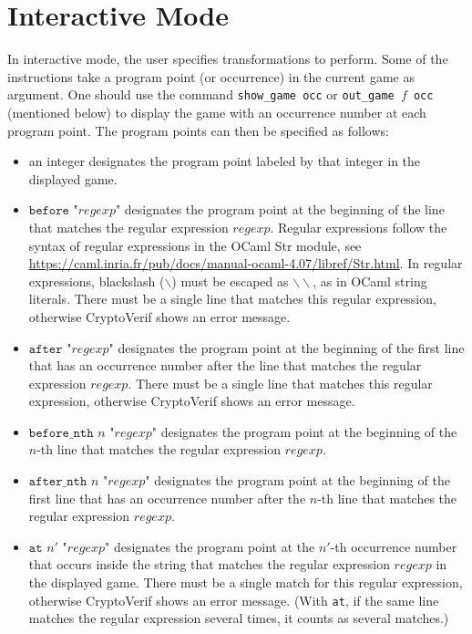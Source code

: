 \documentclass{article}
\begin{document}
\fussy

\section{Interactive Mode}\label{sec:interact}

In interactive mode, the user specifies transformations to perform.
Some of the instructions take a program point (or occurrence)
in the current game as argument.
One should use the command \texttt{show\string_game occ}
or \texttt{out\string_game $f$ occ} (mentioned below) to
display the game with an occurrence number at each program point.
The program points can then be specified as follows:
\begin{itemize}
\item an integer designates the program point labeled by that integer in
  the displayed game.
\item $\texttt{before "}\mathit{regexp}\texttt{"}$ designates the program
  point at the beginning of the line that matches the regular expression
  $\mathit{regexp}$. Regular expressions follow the syntax of regular expressions in the OCaml Str module, see
  \url{https://caml.inria.fr/pub/docs/manual-ocaml-4.07/libref/Str.html}.
  In regular expressions, blackslash ($\backslash$) must be escaped as $\backslash\backslash$, as in OCaml string literals.
  There must be a single line that matches this
  regular expression, otherwise CryptoVerif shows an error message.
  
\item $\texttt{after "}\mathit{regexp}\texttt{"}$ designates the program
  point at the beginning of the first line that has an occurrence number after 
  the line that matches the regular expression
  $\mathit{regexp}$. 
  There must be a single line that matches this
  regular expression, otherwise CryptoVerif shows an error message.

\item $\texttt{before\_nth }n\texttt{ "}\mathit{regexp}\texttt{"}$ designates the program
  point at the beginning of the $n$-th line that matches the regular expression
  $\mathit{regexp}$.  
  
\item $\texttt{after\_nth }n\texttt{ "}\mathit{regexp}\texttt{"}$
  designates the program point at the beginning of the first line
  that has an occurrence number after 
  the $n$-th line that matches the regular expression
  $\mathit{regexp}$.

\item $\texttt{at }n'\texttt{ "}\mathit{regexp}\texttt{"}$
  designates the program point at the $n'$-th occurrence number
  that occurs inside the string that matches the regular expression
  $\mathit{regexp}$ in the displayed game.
  There must be a single match for this
  regular expression, otherwise CryptoVerif shows an error message.
  (With \texttt{at}, if the same line matches the regular expression
  several times, it counts as several matches.)


\end{itemize}
\end{document}
